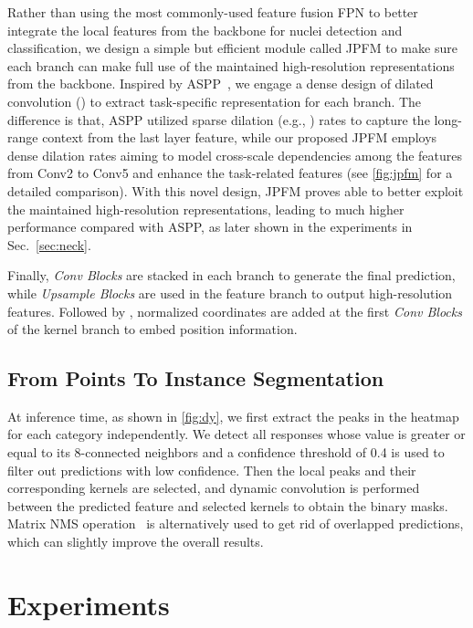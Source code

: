 \documentclass[lettersize,journal]{IEEEtran}
\begin{document}
Rather than using the most commonly-used feature fusion FPN to better integrate the local features from the backbone for nuclei detection and classification, we design a simple but efficient module called JPFM to make sure each branch can make full use of the maintained high-resolution representations from the backbone. Inspired by ASPP~\cite{chen2017deeplab}, we engage a dense design of dilated convolution () to extract task-specific representation for each branch. The difference is that, ASPP utilized sparse dilation (e.g., ) rates to capture the long-range context from the last layer feature, while our proposed JPFM employs dense dilation rates aiming to model cross-scale dependencies among the features from Conv2 to Conv5 and enhance the task-related features (see \autoref{fig:jpfm} for a detailed comparison). With this novel design, JPFM proves able to  better exploit the maintained high-resolution representations, leading to much higher performance compared with ASPP, as later shown in the experiments in Sec.~\ref{sec:neck}.

Finally, \textit{Conv Blocks} are stacked in each branch to generate the final prediction, while \textit{Upsample Blocks} are used in the feature branch to output high-resolution features. Followed by \cite{solov2}, normalized coordinates are added at the first \textit{Conv Blocks} of the kernel branch to embed position information.

\subsection{From Points To Instance Segmentation}
At inference time, as shown in \autoref{fig:dy}, we first extract the peaks in the heatmap for each category independently. We detect all responses whose value is greater or equal to its 8-connected neighbors and a confidence threshold of 0.4 is used to filter out predictions with low confidence. Then the local peaks and their corresponding kernels are selected, and dynamic convolution is performed between the predicted feature and selected kernels to obtain the binary masks. Matrix NMS operation~\cite{solov2} is alternatively used to get rid of overlapped predictions, which can slightly improve the overall results.






\section{Experiments}
\end{document}
